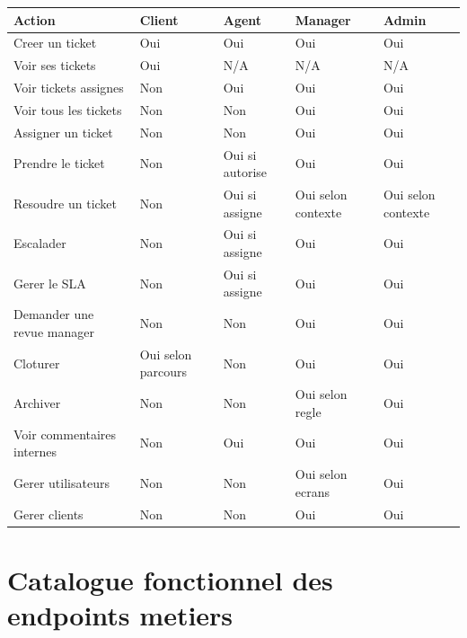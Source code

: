 \documentclass[12pt,a4paper,oneside]{report}
\begin{document}
\begin{longtable}{>{\raggedright\arraybackslash}p{4.8cm} >{\centering\arraybackslash}p{2cm} >{\centering\arraybackslash}p{2cm} >{\centering\arraybackslash}p{2cm} >{\centering\arraybackslash}p{2cm}}
\toprule
Action & Client & Agent & Manager & Admin \\
\midrule
Creer un ticket & Oui & Oui & Oui & Oui \\
Voir ses tickets & Oui & N/A & N/A & N/A \\
Voir tickets assignes & Non & Oui & Oui & Oui \\
Voir tous les tickets & Non & Non & Oui & Oui \\
Assigner un ticket & Non & Non & Oui & Oui \\
Prendre le ticket & Non & Oui si autorise & Oui & Oui \\
Resoudre un ticket & Non & Oui si assigne & Oui selon contexte & Oui selon contexte \\
Escalader & Non & Oui si assigne & Oui & Oui \\
Gerer le SLA & Non & Oui si assigne & Oui & Oui \\
Demander une revue manager & Non & Non & Oui & Oui \\
Cloturer & Oui selon parcours & Non & Oui & Oui \\
Archiver & Non & Non & Oui selon regle & Oui \\
Voir commentaires internes & Non & Oui & Oui & Oui \\
Gerer utilisateurs & Non & Non & Oui selon ecrans & Oui \\
Gerer clients & Non & Non & Oui & Oui \\
\bottomrule
\end{longtable}

\chapter{Catalogue fonctionnel des endpoints metiers}
\end{document}

